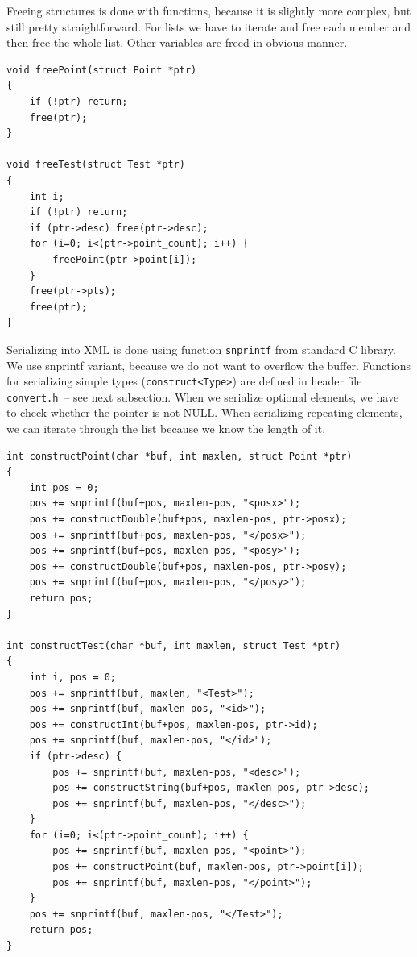 \documentclass[12pt,notitlepage]{report}
\begin{document}
Freeing structures is done with functions, because it is slightly more complex, but still pretty straightforward. For lists we have to iterate and free each member and then free the whole list. Other variables are freed in obvious manner.

\begin{small}
\begin{lstlisting}
void freePoint(struct Point *ptr)
{
    if (!ptr) return;
    free(ptr);
}

void freeTest(struct Test *ptr)
{
    int i;
    if (!ptr) return;
    if (ptr->desc) free(ptr->desc);
    for (i=0; i<(ptr->point_count); i++) {
        freePoint(ptr->point[i]);
    }
    free(ptr->pts);
    free(ptr);
}
\end{lstlisting}
\end{small}

Serializing into XML is done using function \texttt{snprintf} from standard C library. We use snprintf variant, because we do not want to overflow the buffer. Functions for serializing simple types (\texttt{construct<Type>}) are defined in header file \texttt{convert.h}~-- see next subsection. When we serialize optional elements, we have to check whether the pointer is not NULL. When serializing repeating elements, we can iterate through the list because we know the length of it.
\begin{small}
\begin{lstlisting}
int constructPoint(char *buf, int maxlen, struct Point *ptr)
{
    int pos = 0;
    pos += snprintf(buf+pos, maxlen-pos, "<posx>");
    pos += constructDouble(buf+pos, maxlen-pos, ptr->posx);
    pos += snprintf(buf+pos, maxlen-pos, "</posx>");
    pos += snprintf(buf+pos, maxlen-pos, "<posy>");
    pos += constructDouble(buf+pos, maxlen-pos, ptr->posy);
    pos += snprintf(buf+pos, maxlen-pos, "</posy>");
    return pos;
}

int constructTest(char *buf, int maxlen, struct Test *ptr)
{
    int i, pos = 0;
    pos += snprintf(buf, maxlen, "<Test>");
    pos += snprintf(buf, maxlen-pos, "<id>");
    pos += constructInt(buf+pos, maxlen-pos, ptr->id);
    pos += snprintf(buf, maxlen-pos, "</id>");
    if (ptr->desc) {
        pos += snprintf(buf, maxlen-pos, "<desc>");
        pos += constructString(buf+pos, maxlen-pos, ptr->desc);
        pos += snprintf(buf, maxlen-pos, "</desc>");
    }
    for (i=0; i<(ptr->point_count); i++) {
        pos += snprintf(buf, maxlen-pos, "<point>");
        pos += constructPoint(buf, maxlen-pos, ptr->point[i]);
        pos += snprintf(buf, maxlen-pos, "</point>");
    }
    pos += snprintf(buf, maxlen-pos, "</Test>");
    return pos;
}
\end{lstlisting}
\end{small}
\end{document}

